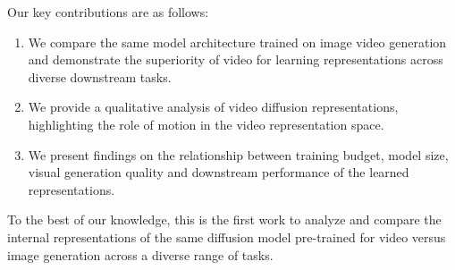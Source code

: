 Our key contributions are as follows:
\begin{enumerate}
    \item We compare the same model architecture trained on image \vs video generation and demonstrate the superiority of video for learning representations across diverse downstream tasks.
    \item We provide a qualitative analysis of video diffusion representations, highlighting the role of motion in the video representation space.
    \item We present findings on the relationship between training budget, model size, visual generation quality and downstream performance of the learned representations.
\end{enumerate}
To the best of our knowledge, this is the first work to analyze and compare the internal representations of the same diffusion model pre-trained for video versus image generation across a diverse range of tasks.
